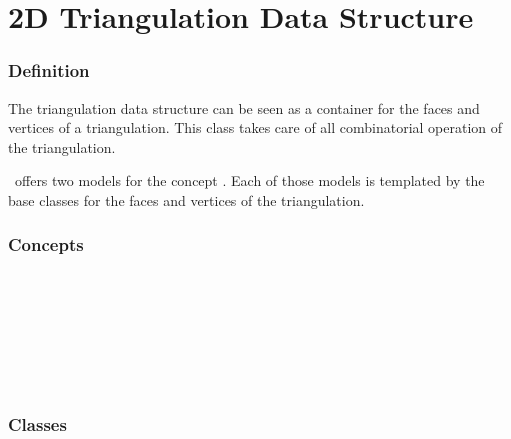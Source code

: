 

\chapter{2D Triangulation Data Structure}

\subsection*{Definition}
The triangulation data structure can be seen as a container
for the faces and vertices of a triangulation. This class takes care
of all combinatorial operation of the triangulation.

\cgal\ offers two models for the concept
.
Each of those models is templated by the base classes for the faces
and vertices of the triangulation.

\subsection*{Concepts}
\\
\\
\\

\\
\\
\\

\subsection*{Classes}
\\
\\

